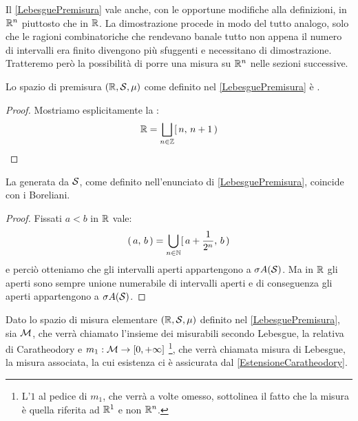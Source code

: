 \begin{remark}
	Il \cref{LebesguePremisura} vale anche, con le opportune modifiche alla definizioni, in $\R^n$ piuttosto che in $\R$. La dimostrazione procede in modo del tutto analogo, solo che le ragioni combinatoriche che rendevano banale tutto non appena il numero di intervalli era finito divengono più sfuggenti e necessitano di dimostrazione. Tratteremo però la possibilità di porre una misura su $\R^n$ nelle sezioni successive.
\end{remark}

\begin{proposition}\label{LebesguePremisuraSigFin}
	Lo spazio di premisura $(\R,\S,\mu)$ come definito nel \cref{LebesguePremisura} è \sigfin[o].
\end{proposition}
\begin{proof}
	Mostriamo esplicitamente la \sigfin[ezza]:
	\begin{equation*}
		\R=\bigsqcup_{n\in\mathbb Z} \so{n}{n+1}
	\end{equation*}
\end{proof}

\begin{proposition}\label{SigAlgUgualeBoreliani}
	La \sigalg{} generata da $\S$, come definito nell'enunciato di \cref{LebesguePremisura}, coincide con i Boreliani.
\end{proposition}
\begin{proof}
	Fissati $a<b$ in $\R$ vale:
	\begin{equation*}
		\oo{a}{b}=\bigcup_{n\in\N}\so{a+\frac1{2^n}}b
	\end{equation*}
	e perciò otteniamo che gli intervalli aperti appartengono a $\sigma A(\S)$.
	Ma in $\R$ gli aperti sono sempre unione numerabile di intervalli aperti e di conseguenza gli aperti appartengono a $\sigma A(\S)$.
\end{proof}



\begin{definition}\label{LebesgueMisura}
	Dato lo spazio di misura elementare $(\R,\S,\mu)$ definito nel \cref{LebesguePremisura}, sia $\M$, che verrà chiamato l'insieme dei misurabili secondo Lebesgue, la relativa \sigalg{} di Caratheodory e $m_1:\M\to\Rpiu$ \footnote{L'$1$ al pedice di $m_1$, che verrà a volte omesso, sottolinea il fatto che la misura è quella riferita ad $\R^1$ e non $\R^n$.}, che verrà chiamata misura di Lebesgue, la misura associata, la cui esistenza ci è assicurata dal \cref{EstensioneCaratheodory}.
\end{definition}

